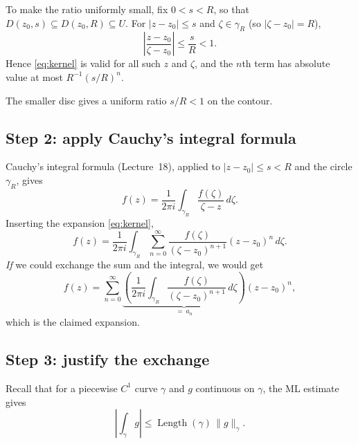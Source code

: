 \documentclass[11pt]{article}
\theoremstyle{plain}
\theoremstyle{definition}
\theoremstyle{remark}
\numberwithin{equation}{section}
\newenvironment{lecturefigure}
 {\par\addvspace{0.25em}\begingroup\setlength{\parskip}{0pt}\centering}
 {\par\endgroup\addvspace{0.25em}}
\begin{document}
To make the ratio uniformly small, fix $0<s<R$, so that
$D(z_0,s)\subseteq D(z_0,R)\subseteq U$. For $|z-z_0|\leq s$ and
$\zeta\in\gamma_R$ (so $|\zeta-z_0|=R$),
\[
 \left|\frac{z-z_0}{\zeta-z_0}\right|\leq\frac{s}{R}<1.
\]
Hence \eqref{eq:kernel} is valid for all such $z$ and $\zeta$, and the
$n$th term has absolute value at most $R^{-1}(s/R)^n$.

\begin{lecturefigure}

{\small The smaller disc gives a uniform ratio $s/R<1$ on the contour.}
\end{lecturefigure}

\subsection{Step 2: apply Cauchy's integral formula}
Cauchy's integral formula (Lecture~18), applied to $|z-z_0|\leq s<R$
and the circle $\gamma_R$, gives
\[
 f(z)=\frac{1}{2\pi i}\int_{\gamma_R}\frac{f(\zeta)}{\zeta-z}\,d\zeta.
\]
Inserting the expansion \eqref{eq:kernel},
\[
 f(z)=\frac{1}{2\pi i}\int_{\gamma_R}
   \sum_{n=0}^{\infty}\frac{f(\zeta)}{(\zeta-z_0)^{n+1}}(z-z_0)^n\,d\zeta.
\]
\emph{If} we could exchange the sum and the integral, we would get
\[
 f(z)=\sum_{n=0}^{\infty}
 \underbrace{\left(\frac{1}{2\pi i}\int_{\gamma_R}
   \frac{f(\zeta)}{(\zeta-z_0)^{n+1}}\,d\zeta\right)}_{=\,a_n}(z-z_0)^n,
\]
which is the claimed expansion.

\subsection{Step 3: justify the exchange}
Recall that for a piecewise $C^1$ curve $\gamma$ and $g$ continuous on
$\gamma$, the ML estimate gives
\[
 \left|\int_\gamma g\right|\leq\operatorname{Length}(\gamma)\,\|g\|_\gamma.
\]
\end{document}
